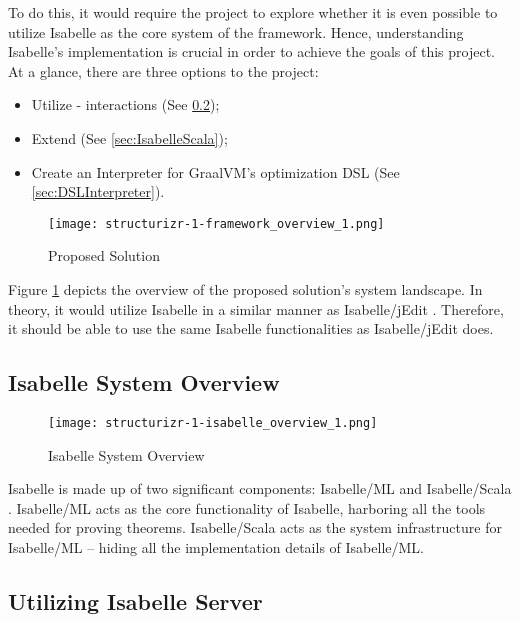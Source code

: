 To do this, it would require the project to explore whether it is even possible to utilize Isabelle as the core system of the framework. 
Hence, understanding Isabelle's implementation is crucial in order to achieve the goals of this project. At a glance, there are three options 
to the project:

\begin{itemize}
    \item Utilize  -  interactions (See \ref{sec:IsabelleServer});
    \item Extend  (See \ref{sec:IsabelleScala});
    \item Create an Interpreter for GraalVM's optimization DSL (See \ref{sec:DSLInterpreter}).
\end{itemize}

\begin{figure}[h]
      \centering
      \texttt{[image: structurizr-1-framework\_overview\_1.png]}
      \caption{Proposed Solution}
      \label{fig:SystemLandscape}
\end{figure}

Figure \ref{fig:SystemLandscape} depicts the overview of the proposed solution's system landscape. In theory, it would utilize Isabelle in a similar 
manner as Isabelle/jEdit \cite{isabelleSystem}. Therefore, it should be able to use the same Isabelle functionalities as Isabelle/jEdit does.

\pagebreak

\subsection{Isabelle System Overview}
\label{sec:IsabelleSystemOverview}

\begin{figure}[h]
      \centering
      \texttt{[image: structurizr-1-isabelle\_overview\_1.png]}
      \caption{Isabelle System Overview}
      \label{fig:IsabelleSystem}
\end{figure}

Isabelle is made up of two significant components: Isabelle/ML and Isabelle/Scala \cite[Ch. 5]{isabelleSystem}. Isabelle/ML acts as the core 
functionality of Isabelle, harboring all the tools needed for proving theorems. Isabelle/Scala acts as the system infrastructure for Isabelle/ML 
-- hiding all the implementation details of Isabelle/ML.

\subsection{Utilizing Isabelle Server}
\label{sec:IsabelleServer}

